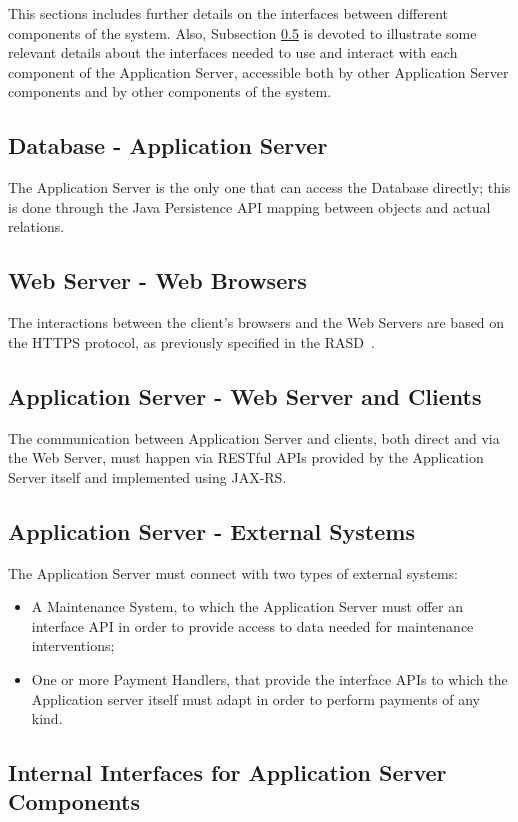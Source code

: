 This sections includes further details on the interfaces between different components of the system. Also, Subsection \ref{int_comps_if} is devoted to illustrate some relevant details about the interfaces needed to use and interact with each component of the Application Server, accessible both by other Application Server components and by other components of the system.

\subsection{Database - Application Server}
The Application Server is the only one that can access the Database directly; this is done through the Java Persistence API mapping between objects and actual relations.

\subsection{Web Server - Web Browsers}
The interactions between the client's browsers and the Web Servers are based on the HTTPS protocol, as previously specified in the RASD~\cite{rasd}.

\subsection{Application Server - Web Server and Clients}
The communication between Application Server and clients, both direct and via the Web Server, must happen via RESTful APIs provided by the Application Server itself and implemented using JAX-RS.

\subsection{Application Server - External Systems}
The Application Server must connect with two types of external systems:
\begin{itemize}
\item A Maintenance System, to which the Application Server must offer an interface API in order to provide access to data needed for maintenance interventions;
\item One or more Payment Handlers, that provide the interface APIs to which the Application server itself must adapt in order to perform payments of any kind.
\end{itemize}

\subsection{Internal Interfaces for Application Server Components}\label{int_comps_if}
